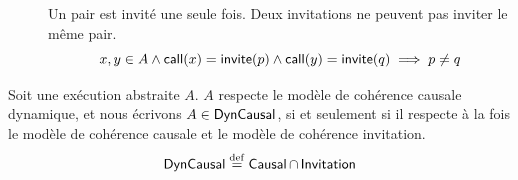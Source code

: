 \begin{definition}[Invitation]
\begin{description}
  \item[]
  Un pair est invité une seule fois.
  Deux invitations ne peuvent pas inviter le même pair.
  \begin{equation*}
      x, y \in A \land \operatorname{\mathsf{call}}(x) = \operatorname{\mathsf{invite}}(p) \land \operatorname{\mathsf{call}}(y) = \operatorname{\mathsf{invite}}(q) \implies p \neq q
  \end{equation*}
  \end{description}
\end{definition}


\begin{definition}\label{def:dyn-causal-consistency}
Soit une exécution abstraite $A$. $A$ respecte le modèle de cohérence causale dynamique, et nous écrivons $A \in \operatorname{\mathsf{DynCausal}}$, si et seulement si il respecte à la fois le modèle de cohérence causale et le modèle de cohérence invitation.
\begin{equation*}
    \operatorname{\mathsf{DynCausal}} \overset{\mathrm{def}}{=} \operatorname{\mathsf{Causal}} \cap \operatorname{\mathsf{Invitation}}
\end{equation*}
\end{definition}


